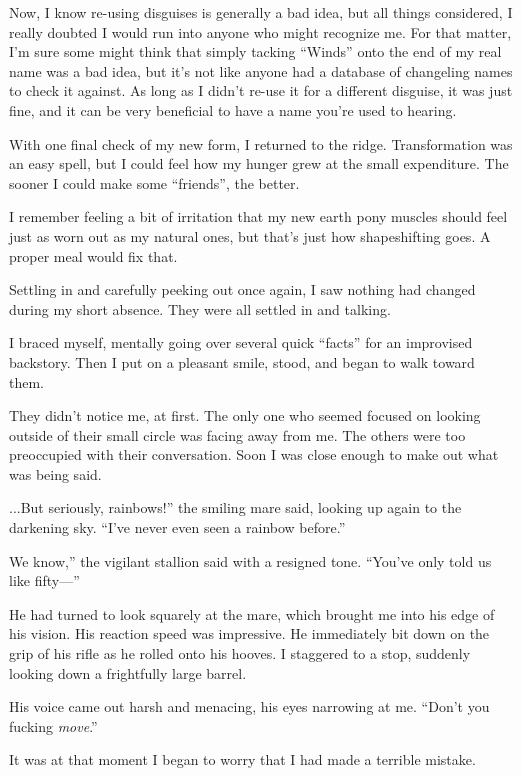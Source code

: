 Now, I know re-using disguises is generally a bad idea, but all things considered, I really doubted I would run into anyone who might recognize me. For that matter, I’m sure some might think that simply tacking “Winds” onto the end of my real name was a bad idea, but it’s not like anyone had a database of changeling names to check it against. As long as I didn’t re-use it for a different disguise, it was just fine, and it can be very beneficial to have a name you’re used to hearing.

With one final check of my new form, I returned to the ridge. Transformation was an easy spell, but I could feel how my hunger grew at the small expenditure. The sooner I could make some “friends”, the better.

I remember feeling a bit of irritation that my new earth pony muscles should feel just as worn out as my natural ones, but that’s just how shapeshifting goes. A proper meal would fix that.

Settling in and carefully peeking out once again, I saw nothing had changed during my short absence. They were all settled in and talking.

I braced myself, mentally going over several quick “facts” for an improvised backstory. Then I put on a pleasant smile, stood, and began to walk toward them.

They didn’t notice me, at first. The only one who seemed focused on looking outside of their small circle was facing away from me. The others were too preoccupied with their conversation. Soon I was close enough to make out what was being said.

\leavevmode{}...But seriously, rainbows!” the smiling mare said, looking up again to the darkening sky. “I’ve never even seen a rainbow before.”

\leavevmode{}We know,” the vigilant stallion said with a resigned tone. “You’ve only told us like fifty—”

He had turned to look squarely at the mare, which brought me into his edge of his vision. His reaction speed was impressive. He immediately bit down on the grip of his rifle as he rolled onto his hooves. I staggered to a stop, suddenly looking down a frightfully large barrel.

His voice came out harsh and menacing, his eyes narrowing at me. “Don’t you fucking \textit{move}.”

It was at that moment I began to worry that I had made a terrible mistake.